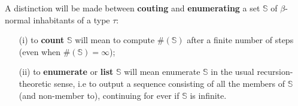 \documentclass[a4paper,10pt]{article}
\begin{document}
\begin{mydef} A distinction will be made between \textbf{couting} and \textbf{enumerating} a set $\mathbb{S}$
of $\beta$-normal inhabitants of a type $\tau$:
\begin{itemize}
 \item[(i)] to \textbf{count} $\mathbb{S}$ will mean to compute $\#(\mathbb{S})$ after a finite number of steps (even when $\#(\mathbb{S})=\infty$);
 \item[(ii)] to \textbf{enumerate} or \textbf{list} $\mathbb{S}$ will mean enumerate $\mathbb{S}$ in the usual recursion-theoretic sense, i.e to
 output a sequence consisting of all the members of $\mathbb{S}$ (and non-member to), continuing for ever if $\mathbb{S}$ is infinite.
\end{itemize}
\end{mydef}
\end{document}
